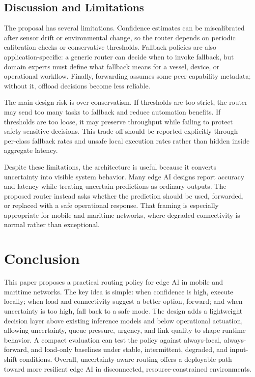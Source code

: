 \documentclass[10pt, conference]{IEEEtran}
\begin{document}
\subsection{Discussion and Limitations}
The proposal has several limitations. Confidence estimates can be miscalibrated after sensor drift or environmental change, so the router depends on periodic calibration checks or conservative thresholds. Fallback policies are also application-specific: a generic router can decide when to invoke fallback, but domain experts must define what fallback means for a vessel, device, or operational workflow. Finally, forwarding assumes some peer capability metadata; without it, offload decisions become less reliable.

The main design risk is over-conservatism. If thresholds are too strict, the router may send too many tasks to fallback and reduce automation benefits. If thresholds are too loose, it may preserve throughput while failing to protect safety-sensitive decisions. This trade-off should be reported explicitly through per-class fallback rates and unsafe local execution rates rather than hidden inside aggregate latency.

Despite these limitations, the architecture is useful because it converts uncertainty into visible system behavior. Many edge AI designs report accuracy and latency while treating uncertain predictions as ordinary outputs. The proposed router instead asks whether the prediction should be used, forwarded, or replaced with a safe operational response. That framing is especially appropriate for mobile and maritime networks, where degraded connectivity is normal rather than exceptional.

\section{Conclusion}
This paper proposes a practical routing policy for edge AI in mobile and maritime networks. The key idea is simple: when confidence is high, execute locally; when load and connectivity suggest a better option, forward; and when uncertainty is too high, fall back to a safe mode. The design adds a lightweight decision layer above existing inference models and below operational actuation, allowing uncertainty, queue pressure, urgency, and link quality to shape runtime behavior. A compact evaluation can test the policy against always-local, always-forward, and load-only baselines under stable, intermittent, degraded, and input-shift conditions. Overall, uncertainty-aware routing offers a deployable path toward more resilient edge AI in disconnected, resource-constrained environments.



\end{document}
